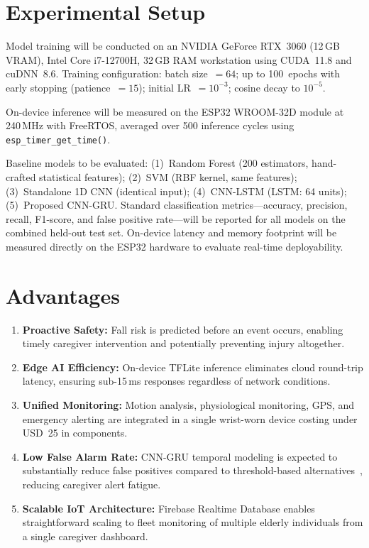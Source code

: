 \documentclass[conference]{IEEEtran}
\begin{document}
\section{Experimental Setup}
\label{sec:exp}

Model training will be conducted on an NVIDIA GeForce RTX~3060 (12\,GB VRAM),
Intel Core i7-12700H, 32\,GB RAM workstation using CUDA~11.8 and
cuDNN~8.6. Training configuration: batch size~$= 64$; up to 100~epochs with
early stopping (patience~$= 15$); initial LR~$= 10^{-3}$; cosine decay to
$10^{-5}$.

On-device inference will be measured on the ESP32 WROOM-32D module at 240\,MHz
with FreeRTOS, averaged over 500 inference cycles using
\texttt{esp\_timer\_get\_time()}.

Baseline models to be evaluated: (1)~Random Forest (200 estimators,
hand-crafted statistical features); (2)~SVM (RBF kernel, same features);
(3)~Standalone 1D CNN (identical input); (4)~CNN-LSTM (LSTM: 64 units);
(5)~Proposed CNN-GRU. Standard classification metrics---accuracy, precision,
recall, F1-score, and false positive rate---will be reported for all models
on the combined held-out test set. On-device latency and memory footprint
will be measured directly on the ESP32 hardware to evaluate real-time
deployability.

\section{Advantages}
\label{sec:advantages}

\begin{enumerate}
  \item \textbf{Proactive Safety:} Fall risk is predicted before an event
        occurs, enabling timely caregiver intervention and potentially
        preventing injury altogether.
  \item \textbf{Edge AI Efficiency:} On-device TFLite inference eliminates
        cloud round-trip latency, ensuring sub-15\,ms responses regardless
        of network conditions.
  \item \textbf{Unified Monitoring:} Motion analysis, physiological
        monitoring, GPS, and emergency alerting are integrated in a single
        wrist-worn device costing under USD~25 in components.
  \item \textbf{Low False Alarm Rate:} CNN-GRU temporal modeling is expected
        to substantially reduce false positives compared to threshold-based
        alternatives~\cite{kumar2024}, reducing caregiver alert fatigue.
  \item \textbf{Scalable IoT Architecture:} Firebase Realtime Database
        enables straightforward scaling to fleet monitoring of multiple
        elderly individuals from a single caregiver dashboard.
\end{enumerate}
\end{document}
